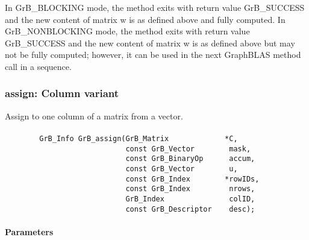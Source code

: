 In {\sf GrB\_BLOCKING} mode, the method exits with return value 
{\sf GrB\_SUCCESS} and the new content of matrix {\sf w} is as defined above
and fully computed.  
In {\sf GrB\_NONBLOCKING} mode, the method exits with return value 
{\sf GrB\_SUCCESS} and the new content of matrix {\sf w} is as defined above 
but may not be fully computed; however, it can be used in the next GraphBLAS 
method call in a sequence.

\subsubsection{{\sf assign}: Column variant}

Assign to one column of a matrix from a vector.  



\paragraph{\syntax}

\begin{verbatim}
        GrB_Info GrB_assign(GrB_Matrix             *C,
                            const GrB_Vector        mask,
                            const GrB_BinaryOp      accum,
                            const GrB_Vector        u,
                            const GrB_Index        *rowIDs,
                            const GrB_Index         nrows,
                            GrB_Index               colID,
                            const GrB_Descriptor    desc); 
\end{verbatim}

\paragraph{Parameters}

